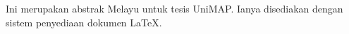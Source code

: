 \begin{MsAbstract}	
	\begin{singlespace}\noindent
		Ini merupakan abstrak Melayu untuk tesis UniMAP.  Ianya disediakan dengan sistem penyediaan dokumen \LaTeX.
	\end{singlespace}
\end{MsAbstract}